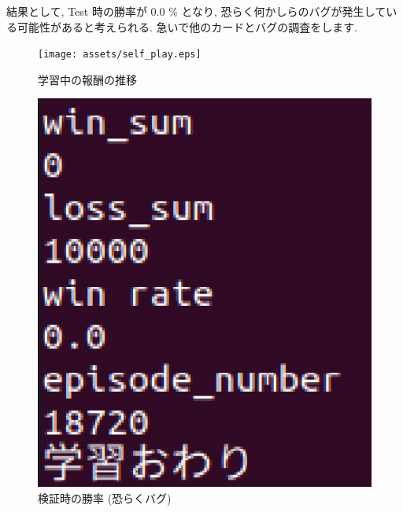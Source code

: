 \documentclass{jarticle}     %
\begin{document}
結果として, Test 時の勝率が 0.0 \% となり, 恐らく何かしらのバグが発生している可能性があると考えられる.
急いで他のカードとバグの調査をします.

\begin{figure}[ht]
  \centering
  \texttt{[image: assets/self\_play.eps]}
  \vspace{-0.3cm}
  \caption{学習中の報酬の推移}
  \label{fig:reward}
\end{figure}

\begin{figure}[ht]
  \centering
  \includegraphics[width=120mm]{assets/result.eps}
  \vspace{-0.3cm}
  \caption{検証時の勝率 (恐らくバグ)}
  \label{fig:result}
\end{figure}
\end{document}
